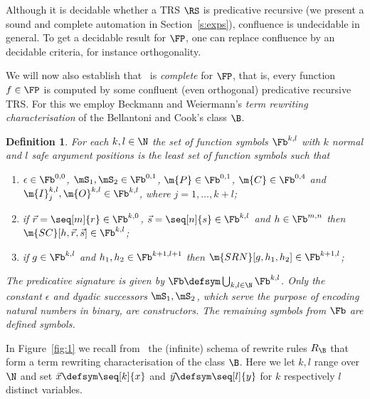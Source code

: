 \documentclass{LMCS}
\newtheorem{definition}[thm]{Definition}
\begin{document}
Although it is decidable whether a TRS $\RS$ is predicative recursive (we 
present a sound and complete automation in Section~\ref{s:exps}), 
confluence is undecidable in general. To get a decidable result for $\FP$, 
one can replace confluence by an decidable criteria, for instance orthogonality. 

We will now also establish that \POPSTAR\ is \emph{complete} for $\FP$, that is, 
every function $f \in \FP$ is computed by some confluent (even orthogonal) 
predicative recursive TRS.\@
For this we employ Beckmann and Weiermann's \emph{term rewriting characterisation} of the 
Bellantoni and Cook's class $\B$.

\begin{definition}{\cite[Definition~2.2]{BW96}}
\label{d:Rb}
For each $k,l \in \N$ the set of function symbols $\Fb^{k,l}$ 
with $k$ normal and $l$ safe argument positions is the 
least set of function symbols such that
\begin{enumerate}[labelsep=*,leftmargin=*]
\item $\epsilon \in \Fb^{0,0}$, $\mS_1,\mS_2 \in \Fb^{0,1}$, $\m{P} \in \Fb^{0,1}$, $\m{C} \in \Fb^{0,4}$
  and $\m{I}^{k,l}_j, \m{O}^{k,l} \in \Fb^{k,l}$, where $j = 1, \dots, k+l$; 
\item if $\vec{r} = \seq[m]{r} \in \Fb^{k,0}$, $\vec{s} = \seq[n]{s} \in \Fb^{k,l}$
  and $h \in \Fb^{m,n}$ then $\m{SC}[h,\vec{r}, \vec{s}] \in \Fb^{k,l}$; 
\item if $g \in \Fb^{k,l}$ and $h_1,h_2 \in \Fb^{k+1,l+1}$ then $\m{SRN}[g,h_1,h_2] \in \Fb^{k+1,l}$; 
\end{enumerate}
The \emph{predicative signature} is given by $\Fb \defsym \bigcup_{k,l \in \N} \Fb^{k,l}$.
Only the constant $\epsilon$ and \emph{dyadic successors} $\mS_1,\mS_2$, 
which serve the purpose of encoding natural numbers in binary, 
are constructors. The remaining symbols from $\Fb$ are defined symbols.
\end{definition}

In Figure~\ref{fig:1} we recall from~\cite[Definition~2.7]{BW96} 
the (infinite) schema of rewrite rules $R_\B$ that 
form a term rewriting characterisation of the class $\B$.
Here we let $k,l$ range over $\N$ and set
$\vec{x} \defsym \seq[k]{x}$ and 
$\vec{y} \defsym \seq[l]{y}$ for $k$ respectively $l$ distinct variables. 
\end{document}
